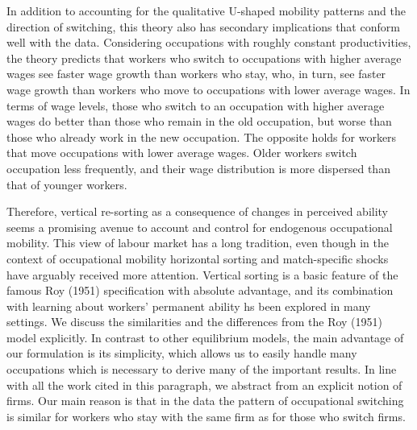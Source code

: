 \documentclass[12pt]{article}
\newcommand{\highlightP}[1]{{\emph{\color{MyPink}{#1}}}}
\theoremstyle{definition}
\begin{document}
In addition to accounting for the qualitative U-shaped mobility patterns and the direction of switching, this theory also has secondary implications that conform well with the data. Considering occupations with roughly constant productivities, the theory predicts that workers who switch to occupations with higher average wages see faster wage growth than workers who stay, who, in turn, see faster wage growth than workers who move to occupations with lower average wages. In terms of wage levels, those who switch to an occupation with higher average wages do better than those who remain in the old occupation, but worse than those who already work in the new occupation. The opposite holds for workers that move occupations with lower average wages. Older workers switch occupation less frequently, and their wage distribution is more dispersed than that of younger workers. \highlightP{Finally, the equilibrium nature of the model implies that occupations with sharply increasing productivity will retain their high earners but shed their low earners, and the opposite holds for occupations with a substantial decline in productivity.}

Therefore, vertical re-sorting as a consequence of changes in perceived ability seems a promising avenue to account and control for endogenous occupational mobility. This view of labour market has a long tradition, even though in the context of occupational mobility horizontal sorting and match-specific shocks have arguably received more attention. Vertical sorting is a basic feature of the famous Roy (1951) specification with absolute advantage, and its combination with learning about workers' permanent ability hs been explored in many settings. We discuss the similarities and the differences from the Roy (1951) model explicitly. \highlightP{Then main distinguishing features arises in the presence of occupational productivity shocks, where decision-theoretic models imply that a rising occupational productivity will make the occupation more attractive for all workers, whereas in our equilibrium model it becomes more attractive only for the more productive workers who compete with and drive out the less able workers.} In contrast to other equilibrium models, the main advantage of our formulation is its simplicity, which allows us to easily handle many occupations which is necessary to derive many of the important results. In line with all the work cited in this paragraph, we abstract from an explicit notion of firms. Our main reason is that in the data the pattern of occupational switching is similar for workers who stay with the same firm as for those who switch firms.
\end{document}
